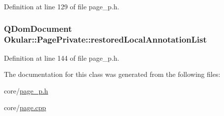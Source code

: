 Definition at line 129 of file page\+\_\+p.\+h.

\hypertarget{classOkular_1_1PagePrivate_ac81ba5bf127f946b7b810821081c9f42}{
\subsubsection[{restored\+Local\+Annotation\+List}]{\setlength{\rightskip}{0pt plus 5cm}Q\+Dom\+Document Okular\+::\+Page\+Private\+::restored\+Local\+Annotation\+List}}\label{classOkular_1_1PagePrivate_ac81ba5bf127f946b7b810821081c9f42}


Definition at line 144 of file page\+\_\+p.\+h.



The documentation for this class was generated from the following files\+:\begin{DoxyCompactItemize}
\item 
core/\hyperlink{page__p_8h}{page\+\_\+p.\+h}\item 
core/\hyperlink{page_8cpp}{page.\+cpp}\end{DoxyCompactItemize}
